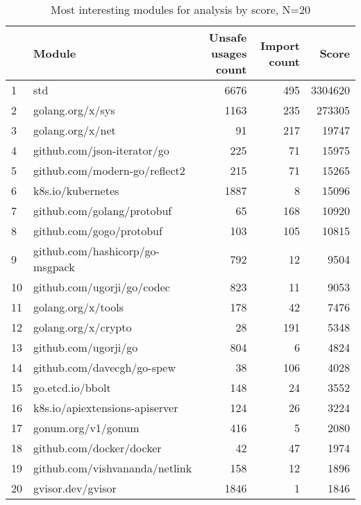 \begin{table}
    \centering
    \caption{Most interesting modules for analysis by score, N=20}
    \label{tbl:most-interesting-modules-by-score}
    \begin{tabular}{llrrr}
        \toprule
        {} &                           Module & Unsafe usages count & Import count &    Score \\
        \midrule
        1  &                              std &                6676 &          495 &  3304620 \\
        2  &                 golang.org/x/sys &                1163 &          235 &   273305 \\
        3  &                 golang.org/x/net &                  91 &          217 &    19747 \\
        4  &      github.com/json-iterator/go &                 225 &           71 &    15975 \\
        5  &    github.com/modern-go/reflect2 &                 215 &           71 &    15265 \\
        6  &                k8s.io/kubernetes &                1887 &            8 &    15096 \\
        7  &       github.com/golang/protobuf &                  65 &          168 &    10920 \\
        8  &         github.com/gogo/protobuf &                 103 &          105 &    10815 \\
        9  &  github.com/hashicorp/go-msgpack &                 792 &           12 &     9504 \\
        10 &       github.com/ugorji/go/codec &                 823 &           11 &     9053 \\
        11 &               golang.org/x/tools &                 178 &           42 &     7476 \\
        12 &              golang.org/x/crypto &                  28 &          191 &     5348 \\
        13 &             github.com/ugorji/go &                 804 &            6 &     4824 \\
        14 &       github.com/davecgh/go-spew &                  38 &          106 &     4028 \\
        15 &                 go.etcd.io/bbolt &                 148 &           24 &     3552 \\
        16 &   k8s.io/apiextensions-apiserver &                 124 &           26 &     3224 \\
        17 &               gonum.org/v1/gonum &                 416 &            5 &     2080 \\
        18 &         github.com/docker/docker &                  42 &           47 &     1974 \\
        19 &   github.com/vishvananda/netlink &                 158 &           12 &     1896 \\
        20 &                gvisor.dev/gvisor &                1846 &            1 &     1846 \\
        \bottomrule
    \end{tabular}
\end{table}

